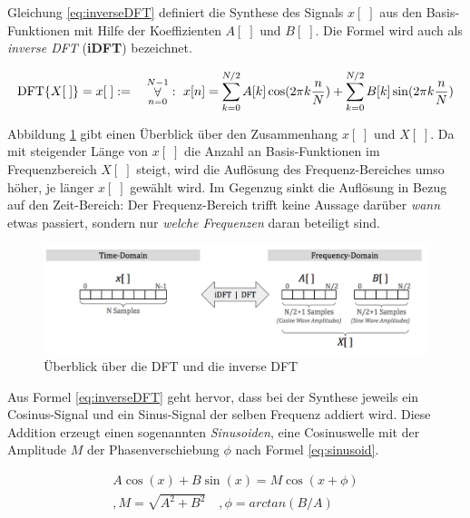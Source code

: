 Gleichung \ref{eq:inverseDFT} definiert die Synthese des Signals $x[\;]$ aus den Basis-Funktionen mit Hilfe der Koeffizienten $A[\;]$ und $B[\;]$. Die Formel wird auch als \emph{inverse DFT} (\textbf{iDFT}) bezeichnet. \cite[S. 152 - 153]{dspGuide}

\begin{equation}
\text{DFT}\{X[\;]\} = x[\;]
:= \quad \mathop{\forall}_{n = 0}^{N-1} :\ x[n] = \sum_{k = 0}^{N/2} A[k]\cos(2\pi k \frac{n}{N}) + \sum_{k = 0}^{N/2}B[k]\sin(2\pi k \frac{n}{N}) \\
\label{eq:inverseDFT}
\end{equation}

Abbildung \ref{img:dtOverview} gibt einen Überblick über den Zusammenhang $x[\;]$ und $X[\;]$. Da mit steigender Länge von $x[\;]$ die Anzahl an Basis-Funktionen im Frequenzbereich $X[\;]$ steigt, wird die Auflösung des Frequenz-Bereiches umso höher, je länger $x[\;]$ gewählt wird. Im Gegenzug sinkt die Auflösung in Bezug auf den Zeit-Bereich: Der Frequenz-Bereich trifft keine Aussage darüber \emph{wann} etwas passiert, sondern nur \emph{welche Frequenzen} daran beteiligt sind.\cite[S. 170]{dspGuide}

\begin{figure}[h]
	\centering
	\includegraphics[width=1\textwidth]{bilder/dftOverview04.png}
	\caption{Überblick über die DFT und die inverse DFT}
	\label{img:dtOverview}
\end{figure}

Aus Formel \ref{eq:inverseDFT} geht hervor, dass bei der Synthese jeweils ein Cosinus-Signal und ein Sinus-Signal der selben Frequenz addiert wird. Diese Addition erzeugt einen sogenannten \emph{Sinusoiden}, eine Cosinuswelle mit der Amplitude $M$ der Phasenverschiebung $\phi$ nach Formel \ref{eq:sinusoid}.\cite[S. 162]{dspGuide}

\begin{equation}
\begin{split}
A \cos(x) + B \sin(x) = M \cos(x + \phi) \\
,M = \sqrt{A^2 + B^2} \quad, \phi = arctan(B/A)
\end{split}
\label{eq:sinusoid}
\end{equation}

